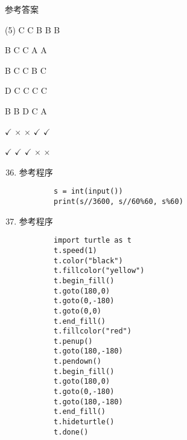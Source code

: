 \documentclass[11pt]{ctexart}
\begin{document}
\begin{center}
    \Huge \heiti 参考答案
\end{center}

    \begin{tasks}[label=\arabic*.](5)
        \task C
        \task C
        \task B
        \task B
        \task B

        \task B
        \task C
        \task C
        \task A
        \task A

        \task B
        \task C
        \task C
        \task B
        \task C

        \task D
        \task C
        \task C
        \task C
        \task C

        \task B
        \task B
        \task D
        \task C
        \task A

        \task $\checkmark$
        \task $\times$
        \task $\times$
        \task $\checkmark$
        \task $\checkmark$

        \task $\checkmark$
        \task $\checkmark$
        \task $\checkmark$
        \task $\times$
        \task $\times$
    \end{tasks}

\begin{enumerate}
    \setcounter{enumi}{35}
    \item 参考程序
    \begin{lstlisting}
        s = int(input())
        print(s//3600, s//60%60, s%60)
    \end{lstlisting}

    \item 参考程序
    \begin{lstlisting}
        import turtle as t
        t.speed(1)
        t.color("black")
        t.fillcolor("yellow")
        t.begin_fill()
        t.goto(180,0)
        t.goto(0,-180)
        t.goto(0,0)
        t.end_fill()
        t.fillcolor("red")
        t.penup()
        t.goto(180,-180)
        t.pendown()
        t.begin_fill()
        t.goto(180,0)
        t.goto(0,-180)
        t.goto(180,-180)
        t.end_fill()
        t.hideturtle()
        t.done()
    \end{lstlisting}
\end{enumerate}
\end{document}
